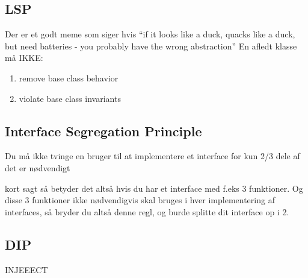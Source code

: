 \documentclass[../SWD_disp.tex]{subfiles}
\begin{document}
\subsection{LSP}
Der er et godt meme som siger hvis ``if it looks like a duck, quacks like a duck, but need batteries - you probably have the wrong abstraction''
En afledt klasse må IKKE:
\begin{enumerate}
    \item remove base class behavior
    \item violate base class invariants
\end{enumerate}
\subsection{Interface Segregation Principle}

Du må ikke tvinge en bruger til at implementere et interface 
for kun 2/3 dele af det er nødvendigt

kort sagt så betyder det altså hvis du har et interface med f.eks 3 funktioner. Og disse 3 funktioner ikke nødvendigvis skal bruges i hver implementering af interfaces, så bryder du altså denne regl, og burde splitte dit interface op i 2.
\subsection{DIP}
INJEEECT
\end{document}

